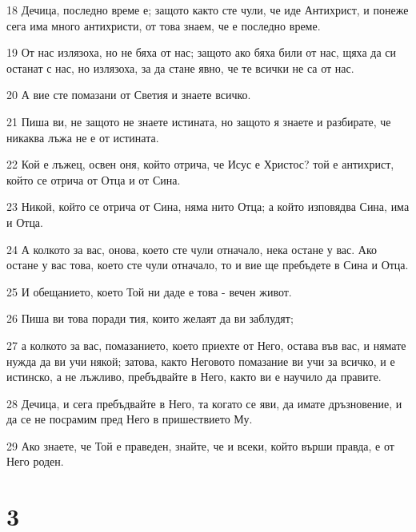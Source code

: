 \par 18 Дечица, последно време е; защото както сте чули, че иде Антихрист, и понеже сега има много антихристи, от това знаем, че е последно време.
\par 19 От нас излязоха, но не бяха от нас; защото ако бяха били от нас, щяха да си останат с нас, но излязоха, за да стане явно, че те всички не са от нас.
\par 20 А вие сте помазани от Светия и знаете всичко.
\par 21 Пиша ви, не защото не знаете истината, но защото я знаете и разбирате, че никаква лъжа не е от истината.
\par 22 Кой е лъжец, освен оня, който отрича, че Исус е Христос? той е антихрист, който се отрича от Отца и от Сина.
\par 23 Никой, който се отрича от Сина, няма нито Отца; а който изповядва Сина, има и Отца.
\par 24 А колкото за вас, онова, което сте чули отначало, нека остане у вас. Ако остане у вас това, което сте чули отначало, то и вие ще пребъдете в Сина и Отца.
\par 25 И обещанието, което Той ни даде е това - вечен живот.
\par 26 Пиша ви това поради тия, които желаят да ви заблудят;
\par 27 а колкото за вас, помазанието, което приехте от Него, остава във вас, и нямате нужда да ви учи някой; затова, както Неговото помазание ви учи за всичко, и е истинско, а не лъжливо, пребъдвайте в Него, както ви е научило да правите.
\par 28 Дечица, и сега пребъдвайте в Него, та когато се яви, да имате дръзновение, и да се не посрамим пред Него в пришествието Му.
\par 29 Ако знаете, че Той е праведен, знайте, че и всеки, който върши правда, е от Него роден.

\chapter{3}

